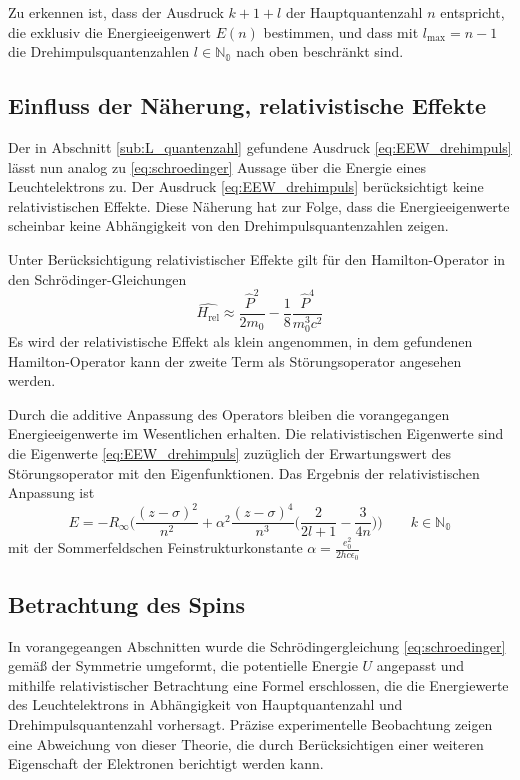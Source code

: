 Zu erkennen ist, dass der Ausdruck $k+1+l$ der Hauptquantenzahl $n$ entspricht, die exklusiv die Energieeigenwert $E(n)$ bestimmen, und dass mit $l_\text{max}=n-1$ die Drehimpulsquantenzahlen $l\in\mathbb{N_0}$ nach oben beschränkt sind.

\subsection{Einfluss der Näherung, relativistische Effekte} %
\label{sub:rel}
Der in Abschnitt \ref{sub:L_quantenzahl} gefundene Ausdruck \eqref{eq:EEW_drehimpuls} lässt nun analog zu \eqref{eq:schroedinger} Aussage über die Energie eines Leuchtelektrons zu.
Der Ausdruck \eqref{eq:EEW_drehimpuls} berücksichtigt keine relativistischen Effekte.
Diese Näherung hat zur Folge, dass die Energieeigenwerte scheinbar keine Abhängigkeit von den Drehimpulsquantenzahlen zeigen.

Unter Berücksichtigung relativistischer Effekte gilt für den Hamilton-Operator in den Schrödinger-Gleichungen
\begin{equation}
	\hat{H_\text{rel}}\approx\frac{\hat{P}^2}{2m_0}-\frac{1}{8}\frac{\hat{P}^4}{m_0^3 c^2}
	\label{eq:relativerhamilton}
\end{equation}
Es wird der relativistische Effekt als klein angenommen, in dem gefundenen Hamilton-Operator kann der zweite Term als Störungsoperator angesehen werden.

Durch die additive Anpassung des Operators bleiben die vorangegangen Energieeigenwerte im Wesentlichen erhalten.
Die relativistischen Eigenwerte sind die Eigenwerte \eqref{eq:EEW_drehimpuls} zuzüglich der Erwartungswert des Störungsoperator mit den Eigenfunktionen.
Das Ergebnis der relativistischen Anpassung ist
\begin{equation}
	E=-R_\infty\biggl(\frac{(z-\sigma)^2}{n^2}+\alpha^2\frac{(z-\sigma)^4}{n^3}\biggl(\frac{2}{2l+1}-\frac{3}{4n}\biggr) \biggr)\qquad k\in\mathbb{N_0}
	\label{eq:EEW_rel}
\end{equation}
mit der Sommerfeldschen Feinstrukturkonstante $\alpha=\frac{e_0^2}{2hc\epsilon_0}$

\subsection{Betrachtung des Spins} %
\label{sub:spin}
In vorangegeangen Abschnitten wurde die Schrödingergleichung \eqref{eq:schroedinger} gemäß der Symmetrie umgeformt, die potentielle Energie $U$ angepasst und mithilfe relativistischer Betrachtung eine Formel erschlossen, die die Energiewerte des Leuchtelektrons in Abhängigkeit von Hauptquantenzahl und Drehimpulsquantenzahl vorhersagt.
Präzise experimentelle Beobachtung zeigen eine Abweichung von dieser Theorie, die durch Berücksichtigen einer weiteren Eigenschaft der Elektronen berichtigt werden kann.

